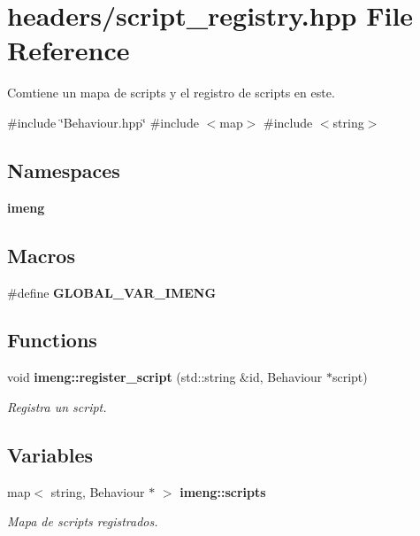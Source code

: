 \section{headers/script\+\_\+registry.hpp File Reference}
\label{script__registry_8hpp}


Comtiene un mapa de scripts y el registro de scripts en este.  


{\ttfamily \#include \char`\"{}Behaviour.\+hpp\char`\"{}}\newline
{\ttfamily \#include $<$map$>$}\newline
{\ttfamily \#include $<$string$>$}\newline
\subsection*{Namespaces}
\begin{DoxyCompactItemize}
\item 
 \textbf{ imeng}
\end{DoxyCompactItemize}
\subsection*{Macros}
\begin{DoxyCompactItemize}
\item 
\#define \textbf{ G\+L\+O\+B\+A\+L\+\_\+\+V\+A\+R\+\_\+\+I\+M\+E\+NG}
\end{DoxyCompactItemize}
\subsection*{Functions}
\begin{DoxyCompactItemize}
\item 
void \textbf{ imeng\+::register\+\_\+script} (std\+::string \&id, Behaviour $\ast$script)
\begin{DoxyCompactList}\small\item\em Registra un script. \end{DoxyCompactList}\end{DoxyCompactItemize}
\subsection*{Variables}
\begin{DoxyCompactItemize}
\item 
map$<$ string, Behaviour $\ast$ $>$ \textbf{ imeng\+::scripts}
\begin{DoxyCompactList}\small\item\em Mapa de scripts registrados. \end{DoxyCompactList}\end{DoxyCompactItemize}



